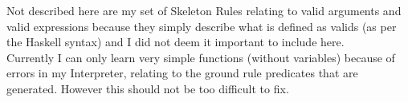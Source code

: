Not described here are my set of Skeleton Rules relating to valid arguments and valid expressions because they simply describe what is defined as valids (as per the Haskell syntax) and I did not deem it important to include here.\\

Currently I can only learn very simple functions (without variables) because of errors in my Interpreter, relating to the ground rule predicates that are generated. However this should not be too difficult to fix. 

\pagebreak
%
%